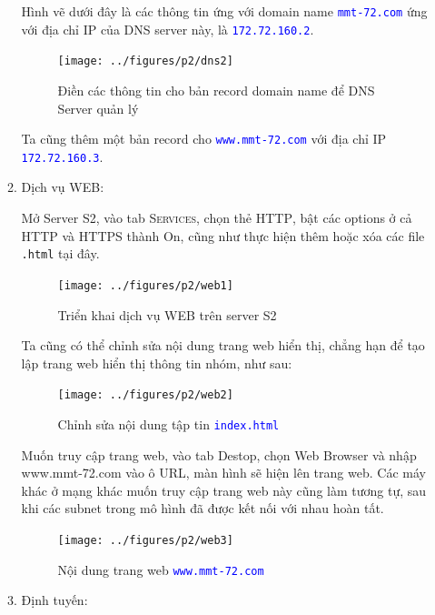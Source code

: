 \begin{enumerate}
\begin{enumerate}
Hình vẽ dưới đây là các thông tin ứng với domain name \texttt{\textcolor{blue}{mmt-72.com}} ứng với địa chỉ IP của DNS server này, là \texttt{\textcolor{blue}{172.72.160.2}}.
\begin{figure}[H]
\begin{center}
\texttt{[image: ../figures/p2/dns2]}
\end{center}
\caption{Điền các thông tin cho bản record domain name để DNS Server quản lý}
\end{figure}

Ta cũng thêm một bản record cho \texttt{\textcolor{blue}{www.mmt-72.com}} với địa chỉ IP \texttt{\textcolor{blue}{172.72.160.3}}.

\item Dịch vụ WEB:

Mở Server \textsc{S2}, vào tab \textsc{Services}, chọn thẻ \textsc{HTTP}, bật các options ở cả HTTP và HTTPS thành On, cũng như thực hiện thêm hoặc xóa các file \texttt{.html} tại đây.

\begin{figure}[H]
\begin{center}
\texttt{[image: ../figures/p2/web1]}
\end{center}
\caption{Triển khai dịch vụ WEB trên server S2}
\end{figure}

Ta cũng có thể chỉnh sửa nội dung trang web hiển thị, chẳng hạn để tạo lập trang web hiển thị thông tin nhóm, như sau:

\begin{figure}[H]
\begin{center}
\texttt{[image: ../figures/p2/web2]}
\end{center}
\caption{Chỉnh sửa nội dung tập tin \texttt{\textcolor{blue}{index.html}}}
\end{figure}

Muốn truy cập trang web, vào tab Destop, chọn Web Browser và nhập www.mmt-72.com vào ô URL, màn hình sẽ hiện lên trang web. Các máy khác ở mạng khác muốn truy cập trang web này cũng làm tương tự, sau khi các subnet trong mô hình đã được kết nối với nhau hoàn tất.

\begin{figure}[H]
\begin{center}
\texttt{[image: ../figures/p2/web3]}
\end{center}
\caption{Nội dung trang web \texttt{\textcolor{blue}{www.mmt-72.com}}}
\end{figure}

\item Định tuyến:


\end{enumerate}
\end{enumerate}
